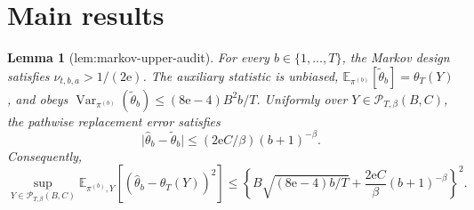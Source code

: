 \documentclass{article}
\newtheorem{lemma}{Lemma}
\begin{document}
\section{Main results}

\begin{lemma}[lem:markov-upper-audit]\label{lem:markov-upper-audit}
For every \(b\in\{1,\ldots,T\}\), the Markov design satisfies \(\nu_{t,b,a}>1/(2\mathrm e)\). The auxiliary statistic is unbiased, \(\mathbb E_{\pi^{(b)}}[\widetilde\theta_b]=\theta_T(Y)\), and obeys \(\operatorname{Var}_{\pi^{(b)}}(\widetilde\theta_b)\le(8\mathrm e-4)B^2b/T\). Uniformly over \(Y\in\mathcal P_{T,\beta}(B,C)\), the pathwise replacement error satisfies \[\lvert\widehat\theta_b-\widetilde\theta_b\rvert\le(2\mathrm e C/\beta)(b+1)^{-\beta}.\] Consequently, \[\sup_{Y\in\mathcal P_{T,\beta}(B,C)}\mathbb E_{\pi^{(b)},Y}[(\widehat\theta_b-\theta_T(Y))^2]\le\left\{B\sqrt{(8\mathrm e-4)b/T}+\frac{2\mathrm e C}{\beta}(b+1)^{-\beta}\right\}^2.\]
\end{lemma}
\end{document}
